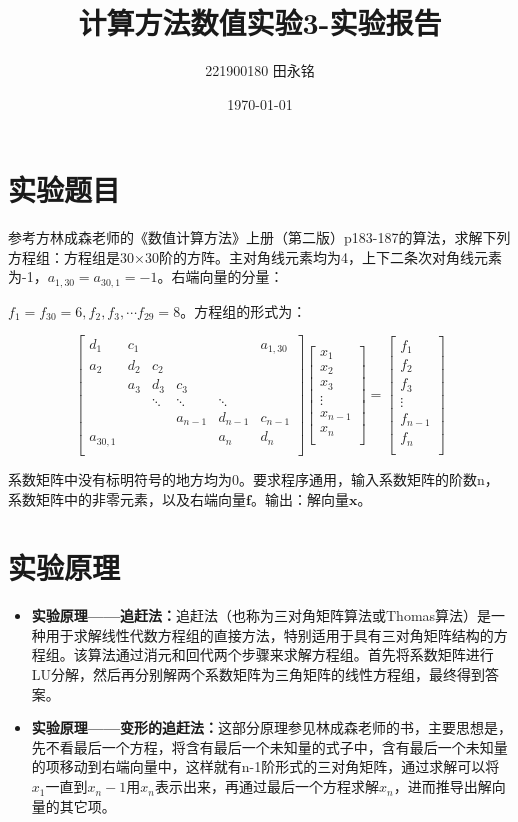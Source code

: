 \documentclass{LabReport}
\title{计算方法数值实验3-实验报告}
\author{221900180 田永铭}
\date{\today}
\begin{document}
	\maketitle
	
	\section{实验题目}
参考方林成森老师的《数值计算方法》上册（第二版）p183-187的算法，求解下列方程组：方程组是30×30阶的方阵。主对角线元素均为4，上下二条次对角线元素为-1，$a_{1,30} = a_{30,1} = -1$。右端向量的分量：

$f_1 = f_{30} = 6, f_2, f_3, \cdots f_{29} = 8。$方程组的形式为：

\[
\begin{bmatrix}
	d_1 & c_1 & & & & a_{1,30} \\
	a_2 & d_2 & c_2 & & & \\
	& a_3 & d_3 & c_3 & & \\
	& & \ddots & \ddots & \ddots & \\
	& & & a_{n-1} & d_{n-1} & c_{n-1} \\
	a_{30,1} & & & & a_n & d_n \\
\end{bmatrix}
\begin{bmatrix}
	x_1 \\
	x_2 \\
	x_3 \\
	\vdots \\
	x_{n-1} \\
	x_n \\
\end{bmatrix}
=
\begin{bmatrix}
	f_1 \\
	f_2 \\
	f_3 \\
	\vdots \\
	f_{n-1} \\
	f_n \\
\end{bmatrix}
\]

系数矩阵中没有标明符号的地方均为0。要求程序通用，输入系数矩阵的阶数n，系数矩阵中的非零元素，以及右端向量$\mathbf{f}$。输出：解向量$\mathbf{x}$。

	\section{实验原理}
	\begin{itemize}
		\item \textbf{实验原理——追赶法：}追赶法（也称为三对角矩阵算法或Thomas算法）是一种用于求解线性代数方程组的直接方法，特别适用于具有三对角矩阵结构的方程组。该算法通过消元和回代两个步骤来求解方程组。首先将系数矩阵进行LU分解，然后再分别解两个系数矩阵为三角矩阵的线性方程组，最终得到答案。

		\item \textbf{实验原理——变形的追赶法：}这部分原理参见林成森老师的书，主要思想是，先不看最后一个方程，将含有最后一个未知量的式子中，含有最后一个未知量的项移动到右端向量中，这样就有n-1阶形式的三对角矩阵，通过求解可以将$x_1$一直到$x_n-1$用$x_n$表示出来，再通过最后一个方程求解$x_n$，进而推导出解向量的其它项。
	\end{itemize}
	
\end{document}

